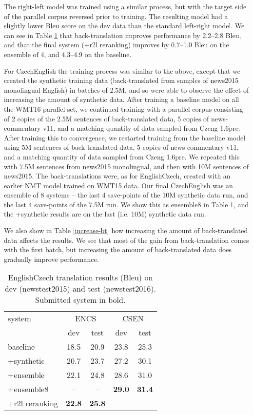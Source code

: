 \documentclass[11pt]{article}
\begin{document}
The right-left model was trained using a similar process, but with the target side of the parallel corpus reversed prior to training. The
resulting model had a slightly lower {\sc Bleu} score on the dev data than the standard left-right model.
We can see in Table \ref{results-cs} that back-translation improves performance by 
2.2--2.8 {\sc Bleu}, and that 
 the final system (+r2l reranking) improves by 0.7--1.0 {\sc Bleu} on the ensemble of 4, and 4.3--4.9 on the baseline.

For CzechEnglish the training process was similar to the above, except that we created the synthetic training data (back-translated from samples of news2015 monolingual English)
in batches of 2.5M, and so were able to observe the effect of increasing the amount of synthetic data. After training a baseline model on all the WMT16 parallel set, 
we continued training with a parallel corpus consisting of 2 copies of the 2.5M sentences of back-translated data, 5 copies of news-commentary v11, and a matching 
quantity of data sampled from Czeng 1.6pre. After training this to convergence, we restarted training from the baseline model using 5M sentences of 
back-translated data, 5 copies of news-commentary v11, and a matching quantity of data sampled from Czeng 1.6pre. We repeated this with 7.5M sentences from
news2015 monolingual, and then with 10M sentences of news2015. The back-translations were, as for EnglishCzech, created with an earlier NMT 
model trained on WMT15 data.
Our final CzechEnglish was an ensemble of 8 systems -- the last 4 save-points of the 10M synthetic data run, and the last 4 save-points of the
7.5M run. We show this as ensemble8 in Table \ref{results-cs}, and the +synthetic results are on the last (i.e. 10M) synthetic data run. 

We also show in Table \ref{increase-bt} how increasing the amount of back-translated data
affects the results. We see that most of the gain from back-translation comes with the first batch, but increasing the amount of back-translated data does
gradually improve performance.

\begin{table}
\centering
\begin{tabular}{l|cc|cc}
system & \multicolumn{2}{c|}{ENCS} & \multicolumn{2}{c}{CSEN}\\
& dev & test & dev & test\\
\hline
baseline & 18.5 & 20.9 &   23.8 & 25.3\\ +synthetic & 20.7 & 23.7 &  27.2 & 30.1 \\ +ensemble & 22.1 & 24.8 &  28.6 & 31.0 \\ +ensemble8 & -- & -- & 
\textbf{29.0} & \textbf{31.4} \\ +r2l reranking & \textbf{22.8} & \textbf{25.8} &  -- & -- \\
\end{tabular}
\caption{EnglishCzech translation results ({\sc Bleu}) on dev (newstest2015) and test (newstest2016). Submitted system in bold.}
\label{results-cs}
\end{table}
\end{document}
